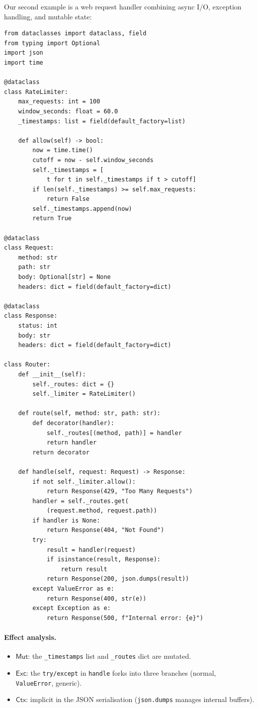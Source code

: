 \documentclass[11pt]{article}
\newcommand{\Exc}{\mathsf{Exc}}          %
\newcommand{\Mut}{\mathsf{Mut}}          %
\newcommand{\Ctx}{\mathsf{Ctx}}          %
\begin{document}
Our second example is a web request handler combining async I/O,
exception handling, and mutable state:

\begin{lstlisting}[style=jugeo-python,caption={Web request handler.}]
from dataclasses import dataclass, field
from typing import Optional
import json
import time

@dataclass
class RateLimiter:
    max_requests: int = 100
    window_seconds: float = 60.0
    _timestamps: list = field(default_factory=list)

    def allow(self) -> bool:
        now = time.time()
        cutoff = now - self.window_seconds
        self._timestamps = [
            t for t in self._timestamps if t > cutoff]
        if len(self._timestamps) >= self.max_requests:
            return False
        self._timestamps.append(now)
        return True

@dataclass
class Request:
    method: str
    path: str
    body: Optional[str] = None
    headers: dict = field(default_factory=dict)

@dataclass
class Response:
    status: int
    body: str
    headers: dict = field(default_factory=dict)

class Router:
    def __init__(self):
        self._routes: dict = {}
        self._limiter = RateLimiter()

    def route(self, method: str, path: str):
        def decorator(handler):
            self._routes[(method, path)] = handler
            return handler
        return decorator

    def handle(self, request: Request) -> Response:
        if not self._limiter.allow():
            return Response(429, "Too Many Requests")
        handler = self._routes.get(
            (request.method, request.path))
        if handler is None:
            return Response(404, "Not Found")
        try:
            result = handler(request)
            if isinstance(result, Response):
                return result
            return Response(200, json.dumps(result))
        except ValueError as e:
            return Response(400, str(e))
        except Exception as e:
            return Response(500, f"Internal error: {e}")
\end{lstlisting}

\paragraph{Effect analysis.}
\begin{itemize}[nosep]
\item $\Mut$: the \texttt{\_timestamps} list and \texttt{\_routes}
  dict are mutated.
\item $\Exc$: the \texttt{try/except} in \texttt{handle} forks into
  three branches (normal, \texttt{ValueError}, generic).
\item $\Ctx$: implicit in the JSON serialisation (\texttt{json.dumps}
  manages internal buffers).
\end{itemize}
\end{document}
